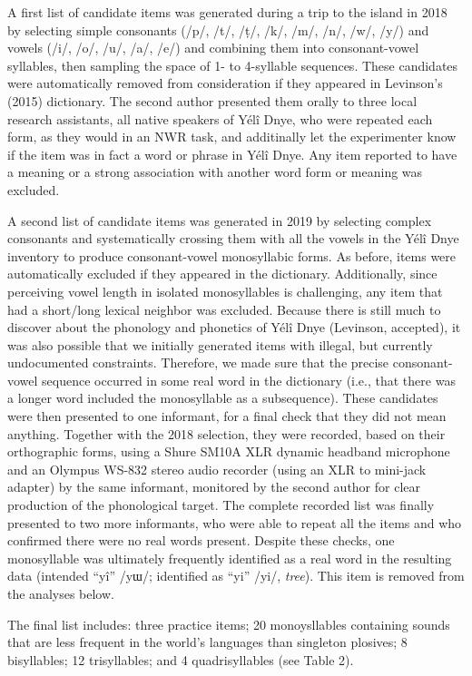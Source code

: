 \documentclass[english,,man,floatsintext]{apa6}
\begin{document}
A first list of candidate items was generated during a trip to the
island in 2018 by selecting simple consonants (/p/, /t/, /ṭ/, /k/, /m/,
/n/, /w/, /y/) and vowels (/i/, /o/, /u/, /a/, /e/) and combining them
into consonant-vowel syllables, then sampling the space of 1- to
4-syllable sequences. These candidates were automatically removed from
consideration if they appeared in Levinson's (2015) dictionary. The
second author presented them orally to three local research assistants,
all native speakers of Yélî Dnye, who were repeated each form, as they
would in an NWR task, and additinally let the experimenter know if the
item was in fact a word or phrase in Yélî Dnye. Any item reported to
have a meaning or a strong association with another word form or meaning
was excluded.

A second list of candidate items was generated in 2019 by selecting
complex consonants and systematically crossing them with all the vowels
in the Yélî Dnye inventory to produce consonant-vowel monosyllabic
forms. As before, items were automatically excluded if they appeared in
the dictionary. Additionally, since perceiving vowel length in isolated
monosyllables is challenging, any item that had a short/long lexical
neighbor was excluded. Because there is still much to discover about the
phonology and phonetics of Yélî Dnye (Levinson, accepted), it was also
possible that we initially generated items with illegal, but currently
undocumented constraints. Therefore, we made sure that the precise
consonant-vowel sequence occurred in some real word in the dictionary
(i.e., that there was a longer word included the monosyllable as a
subsequence). These candidates were then presented to one informant, for
a final check that they did not mean anything. Together with the 2018
selection, they were recorded, based on their orthographic forms, using
a Shure SM10A XLR dynamic headband microphone and an Olympus WS-832
stereo audio recorder (using an XLR to mini-jack adapter) by the same
informant, monitored by the second author for clear production of the
phonological target. The complete recorded list was finally presented to
two more informants, who were able to repeat all the items and who
confirmed there were no real words present. Despite these checks, one
monosyllable was ultimately frequently identified as a real word in the
resulting data (intended ``yî'' /yɯ/; identified as ``yi'' /yi/,
\emph{tree}). This item is removed from the analyses below.

The final list includes: three practice items; 20 monoysllables
containing sounds that are less frequent in the world's languages than
singleton plosives; 8 bisyllables; 12 trisyllables; and 4
quadrisyllables (see Table 2).
\end{document}
